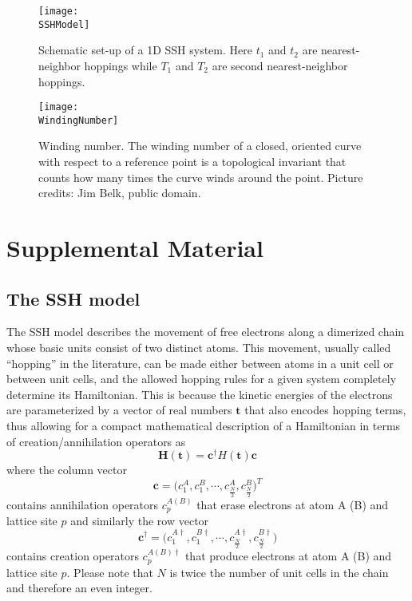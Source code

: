 \documentclass[10pt]{revtex4-1}
\newcommand\SSHModel{./supp_ssh_model.pdf}
\newcommand\WindingNumber{./supp_winding.png}
\begin{document}
\begin{figure}
  \centering
  \texttt{[image: \\SSHModel]}
  \caption{Schematic set-up of a 1D SSH system. Here $t_1$ and $t_2$ are nearest-neighbor hoppings while $T_1$ and $T_2$ are second nearest-neighbor hoppings.}
\label{fig:model}
\end{figure}

\begin{figure}%
  \centering
  \texttt{[image: \\WindingNumber]}
  \caption{Winding number. The winding number of a closed, oriented curve with respect to a reference point is a topological invariant that counts how many times the curve winds around the point. Picture credits: Jim Belk, public domain.}
\label{fig:winding}
\end{figure}

\section*{Supplemental Material}
\subsection*{The SSH model}
\label{sshapp}

The SSH model \cite{asboth2016short} describes the movement of free electrons along a dimerized chain whose basic units consist of two distinct atoms. This movement, usually called ``hopping'' in the literature, can be made either between atoms in a unit cell or between unit cells, and the allowed hopping rules for a given system completely determine its Hamiltonian. This is because the kinetic energies of the electrons are parameterized by a vector of real numbers $\mathbf{t}$ that also encodes hopping terms, thus allowing for a compact mathematical description of a Hamiltonian in terms of creation/annihilation operators as
\begin{equation}
\label{SSH}
\mathbf{H}(\mathbf{t})=\mathbf{c}^{\dagger}H(\mathbf{t})\mathbf{c}
\end{equation}
where the column vector
\begin{equation*}
\mathbf{c} =\Big(c^{A}_1,c^{B}_1,\cdots,c^{A}_\frac{N}{2},c^{B}_\frac{N}{2}\Big)^T
\end{equation*}
contains annihilation operators $c^{A(B)}_p$ that erase electrons at atom A (B) and lattice site $p$ and similarly the row vector
\begin{equation*}
\mathbf{c}^\dagger =\Big(c^{A\dagger}_1,c^{B\dagger}_1,\cdots,c^{A\dagger}_\frac{N}{2},c^{B\dagger}_\frac{N}{2}\Big)
\end{equation*}
contains creation operators $c^{A(B)\dagger}_p$ that produce electrons at atom A (B) and lattice site $p$. Please note that $N$ is twice the number of unit cells in the chain and therefore an even integer.
\end{document}
